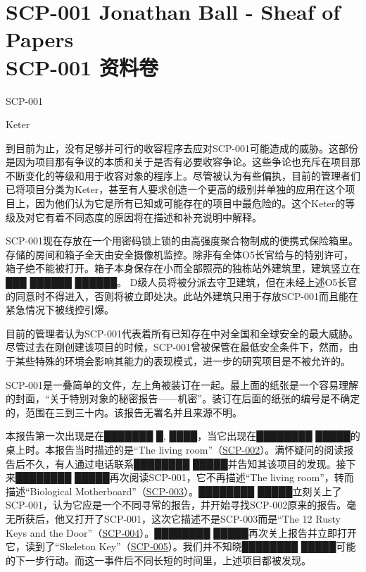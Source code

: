 \chapter[SCP-001 资料卷]{
	SCP-001 Jonathan Ball - Sheaf of Papers\\
	SCP-001 资料卷
}

\label{chap:SCP-001.sheaf.of.papers}

SCP-001

Keter

到目前为止，没有足够并可行的收容程序去应对SCP-001可能造成的威胁。这部份是因为项目那有争议的本质和关于是否有必要收容争论。这些争论也充斥在项目那不断变化的等级和用于收容对象的程序上。尽管被认为有些偏执，目前的管理者们已将项目分类为Keter，甚至有人要求创造一个更高的级别并单独的应用在这个项目上，因为他们认为它是所有已知或可能存在的项目中最危险的。这个Keter的等级及对它有着不同态度的原因将在描述和补充说明中解释。

SCP-001现在存放在一个用密码锁上锁的由高强度聚合物制成的便携式保险箱里。存储的房间和箱子全天由安全摄像机监控。除非有全体O5长官给与的特别许可，箱子绝不能被打开。箱子本身保存在小而全部照亮的独栋站外建筑里，建筑竖立在███ ██████ ██████。 D级人员将被分派去守卫建筑，但在未经上述O5长官的同意时不得进入，否则将被立即处决。此站外建筑只用于存放SCP-001而且能在紧急情况下被线控引爆。

目前的管理者认为SCP-001代表着所有已知存在中对全国和全球安全的最大威胁。尽管过去在刚创建该项目的时候，SCP-001曾被保管在最低安全条件下，然而，由于某些特殊的环境会影响其能力的表现模式，进一步的研究项目是不被允许的。

SCP-001是一叠简单的文件，左上角被装订在一起。最上面的纸张是一个容易理解的封面，“关于特别对象的秘密报告——机密”。装订在后面的纸张的编号是不确定的，范围在三到三十内。该报告无署名并且来源不明。

本报告第一次出现是在███████ █, ████，当它出现在████████ █████的桌上时。本报告当时描述的是“The living room”（\hyperref[chap:SCP-002]{SCP-002}）。满怀疑问的阅读报告后不久，有人通过电话联系████████ █████并告知其该项目的发现。接下来████████ █████再次阅读SCP-001，它不再描述“The living room”，转而描述“Biological Motherboard”（\hyperref[chap:SCP-003]{SCP-003}）。████████ █████立刻关上了SCP-001，认为它应是一个不同寻常的报告，并开始寻找SCP-002原来的报告。毫无所获后，他又打开了SCP-001，这次它描述不是SCP-003而是“The 12 Rusty Keys and the Door”（\hyperref[chap:SCP-004]{SCP-004}）。████████ █████再次关上报告并立即打开它，读到了“Skeleton Key”（\hyperref[chap:SCP-005]{SCP-005}）。我们并不知晓████████ █████可能的下一步行动。而这一事件后不同长短的时间里，上述项目都被发现。

